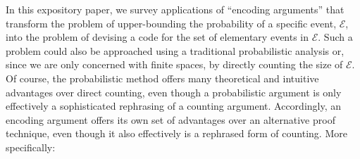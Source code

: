 \documentclass{patmorin}
\newcommand{\aremark}[3]{\textcolor{blue}{\textsc{#1 #2:}}
  \textcolor{red}{\textsf{#3}}}
\newcommand{\tommy}[2][says]{\aremark{Tommy}{#1}{#2}}
\newcommand{\wolfgang}[2][says]{\aremark{Wolfgang}{#1}{#2}}
\begin{document}
In this expository paper,
we survey applications of ``encoding arguments'' that transform the
problem of upper-bounding the probability of a specific event,
$\mathcal{E}$, into the problem of devising a code for the set of
elementary events in $\mathcal{E}$. Such a problem could also be
approached using a traditional probabilistic analysis or, since we are
only concerned with finite spaces, by directly counting the size of
$\mathcal{E}$. Of course, the probabilistic method offers many
theoretical and intuitive advantages over direct counting, even though
a probabilistic argument is only effectively a sophisticated
rephrasing of a counting argument. Accordingly, an encoding argument
offers its own set of advantages over an alternative proof technique,
even though it also effectively is a rephrased form of counting. More
specifically:
\end{document}
